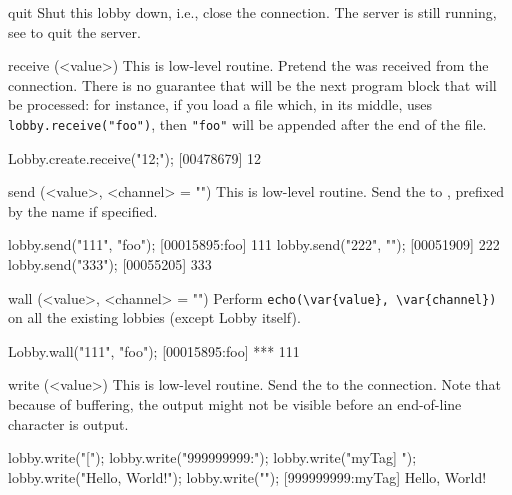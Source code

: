 \begin{urbiscriptapi}
\item[quit] Shut this lobby down, i.e., close the connection.  The
  server is still running, see  to quit the
  server.

\item[receive](<value>)%
  This is low-level routine.  Pretend the 
   was received from the connection.  There is no guarantee
  that  will be the next program block that will be
  processed: for instance, if you load a file which, in its middle,
  uses \lstinline|lobby.receive("foo")|, then \lstinline|"foo"| will
  be appended after the end of the file.
\begin{urbiscript}
Lobby.create.receive("12;");
[00478679] 12
\end{urbiscript}

\item[send](<value>, <channel> = "")%
  This is low-level routine.  Send the  
  to \this, prefixed by the 
   name if specified.
\begin{urbiscript}
lobby.send("111", "foo");
[00015895:foo] 111
lobby.send("222", "");
[00051909] 222
lobby.send("333");
[00055205] 333
\end{urbiscript}

\item[wall](<value>, <channel> = "")%
  Perform \lstinline|echo(\var{value}, \var{channel})| on all the
  existing lobbies (except Lobby itself).
\begin{urbiscript}[firstnumber=1]
Lobby.wall("111", "foo");
[00015895:foo] *** 111
\end{urbiscript}

\item[write](<value>)%
  This is low-level routine.  Send the  
  to the connection.  Note that because of buffering, the output might
  not be visible before an end-of-line character is output.
\begin{urbiscript}
lobby.write("[");
lobby.write("999999999:");
lobby.write("myTag] ");
lobby.write("Hello, World!");
lobby.write("\n");
[999999999:myTag] Hello, World!
\end{urbiscript}
\end{urbiscriptapi}

